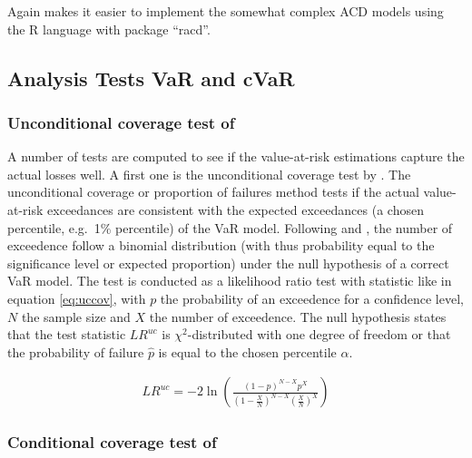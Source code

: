 \documentclass[a4paper, twoside]{templates/ociamthesis}
\begin{document}
Again \textcite{ghalanos2016} makes it easier to implement the somewhat complex ACD models using the R language with package ``racd''.

\hypertarget{analysis-tests-var-and-cvar}{%
\subsection{Analysis Tests VaR and cVaR}\label{analysis-tests-var-and-cvar}}

\hypertarget{unconditional-coverage-test-of-kupiec1995}{%
\subsubsection{\texorpdfstring{Unconditional coverage test of \textcite{kupiec1995}}{Unconditional coverage test of @kupiec1995}}\label{unconditional-coverage-test-of-kupiec1995}}

A number of tests are computed to see if the value-at-risk estimations capture the actual losses well. A first one is the unconditional coverage test by \textcite{kupiec1995}. The unconditional coverage or proportion of failures method tests if the actual value-at-risk exceedances are consistent with the expected exceedances (a chosen percentile, e.g.~1\% percentile) of the VaR model. Following \textcite{kupiec1995} and \textcite{ghalanos2020}, the number of exceedence follow a binomial distribution (with thus probability equal to the significance level or expected proportion) under the null hypothesis of a correct VaR model. The test is conducted as a likelihood ratio test with statistic like in equation \eqref{eq:uccov}, with \(p\) the probability of an exceedence for a confidence level, \(N\) the sample size and \(X\) the number of exceedence. The null hypothesis states that the test statistic \(L R^{u c}\) is \(\chi^2\)-distributed with one degree of freedom or that the probability of failure \(\hat p\) is equal to the chosen percentile \(\alpha\).

\begin{align}
L R^{u c}=-2 \ln \left(\frac{(1-p)^{N-X} p^{X}}{\left(1-\frac{X}{N}\right)^{N-X}\left(\frac{X}{N}\right)^{X}}\right)
\label{eq:uccov}
\end{align}

\hypertarget{conditional-coverage-test-of-christoffersen2001}{%
\subsubsection{\texorpdfstring{Conditional coverage test of \textcite{christoffersen2001}}{Conditional coverage test of @christoffersen2001}}\label{conditional-coverage-test-of-christoffersen2001}}
\end{document}
